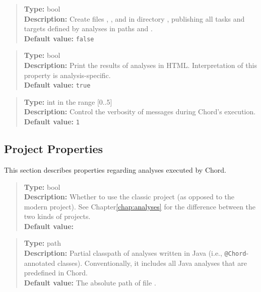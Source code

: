 \begin{quote}
{\bf Type:} bool \\
{\bf Description:} Create files , , and 
 in directory , publishing all tasks and targets defined by analyses in paths  and
 .  \\
{\bf Default value:} {\tt false}
\end{quote}

\begin{quote}
{\bf Type:} bool \\
{\bf Description:} Print the results of analyses in HTML.  Interpretation of this property is analysis-specific.  \\
{\bf Default value:} {\tt true}
\end{quote}

\begin{quote}
{\bf Type:} int in the range [0..5]  \\
{\bf Description:} Control the verbosity of messages during Chord's execution.  \\
{\bf Default value:} {\tt 1}
\end{quote}

\subsection{Project Properties}
\label{sec:project-props}

This section describes properties regarding analyses executed by Chord.

\begin{quote}
{\bf Type:} bool \\
{\bf Description:} Whether to use the classic project (as opposed to the modern project).  See Chapter\ref{chap:analyses} for the difference
 between the two kinds of projects. \\
{\bf Default value:} 
\end{quote}

\begin{quote}
{\bf Type:} path \\
{\bf Description:} Partial classpath of analyses written in Java (i.e., {\tt @Chord}-annotated classes).
Conventionally, it includes all Java analyses that are predefined in Chord.  \\
{\bf Default value:} The absolute path of file .
\end{quote}

